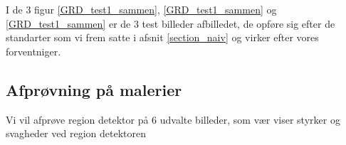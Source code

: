 \begin{figure}[!h]
    \centering
		\hspace{1em}
    	\hspace{1em}
        \caption[]{}
     \label{GRD_test3_sammen}
\end{figure}

I de 3 figur \ref{GRD_test1_sammen}, \ref{GRD_test1_sammen} og
\ref{GRD_test1_sammen} er de 3 test billeder afbilledet, de opføre sig
efter de standarter som vi frem satte i afsnit \ref{section_naiv} og
virker efter vores forventniger.
\clearpage

\subsection{Afprøvning på malerier}
Vi vil afprøve region detektor på 6 udvalte billeder, som vær viser
styrker og svagheder ved region detektoren

